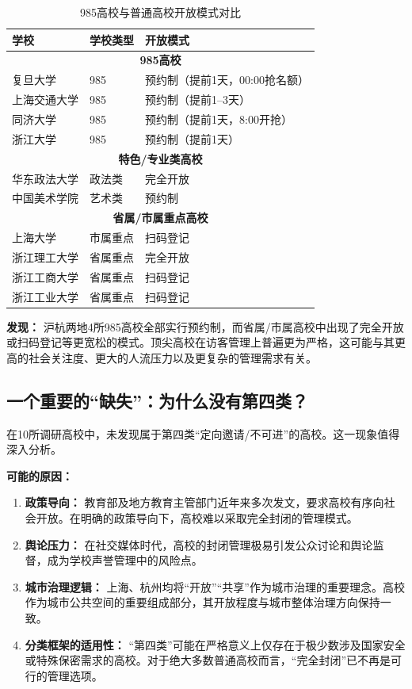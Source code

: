 \documentclass[12pt]{article}
\begin{document}
\begin{table}[H]
\centering
\caption{985高校与普通高校开放模式对比}
\label{tab:985}
\begin{tabular}{p{3.5cm}p{2.5cm}p{5.5cm}}
\toprule
\textbf{学校} & \textbf{学校类型} & \textbf{开放模式} \\
\midrule
\multicolumn{3}{c}{\textbf{985高校}} \\
\midrule
复旦大学 & 985 & 预约制（提前1天，00:00抢名额） \\
上海交通大学 & 985 & 预约制（提前1–3天） \\
同济大学 & 985 & 预约制（提前1天，8:00开抢） \\
浙江大学 & 985 & 预约制（提前1天） \\
\midrule
\multicolumn{3}{c}{\textbf{特色/专业类高校}} \\
\midrule
华东政法大学 & 政法类 & 完全开放 \\
中国美术学院 & 艺术类 & 预约制 \\
\midrule
\multicolumn{3}{c}{\textbf{省属/市属重点高校}} \\
\midrule
上海大学 & 市属重点 & 扫码登记 \\
浙江理工大学 & 省属重点 & 完全开放 \\
浙江工商大学 & 省属重点 & 扫码登记 \\
浙江工业大学 & 省属重点 & 扫码登记 \\
\bottomrule
\end{tabular}
\end{table}

\textbf{发现：} 沪杭两地4所985高校全部实行预约制，而省属/市属高校中出现了完全开放或扫码登记等更宽松的模式。顶尖高校在访客管理上普遍更为严格，这可能与其更高的社会关注度、更大的人流压力以及更复杂的管理需求有关。

\subsection{一个重要的“缺失”：为什么没有第四类？}

在10所调研高校中，未发现属于第四类“定向邀请/不可进”的高校。这一现象值得深入分析。

\textbf{可能的原因：}

\begin{enumerate}[leftmargin=2em]
    \item \textbf{政策导向：} 教育部及地方教育主管部门近年来多次发文，要求高校有序向社会开放。在明确的政策导向下，高校难以采取完全封闭的管理模式。
    \item \textbf{舆论压力：} 在社交媒体时代，高校的封闭管理极易引发公众讨论和舆论监督，成为学校声誉管理中的风险点。
    \item \textbf{城市治理逻辑：} 上海、杭州均将“开放”“共享”作为城市治理的重要理念。高校作为城市公共空间的重要组成部分，其开放程度与城市整体治理方向保持一致。
    \item \textbf{分类框架的适用性：} “第四类”可能在严格意义上仅存在于极少数涉及国家安全或特殊保密需求的高校。对于绝大多数普通高校而言，“完全封闭”已不再是可行的管理选项。
\end{enumerate}
\end{document}
